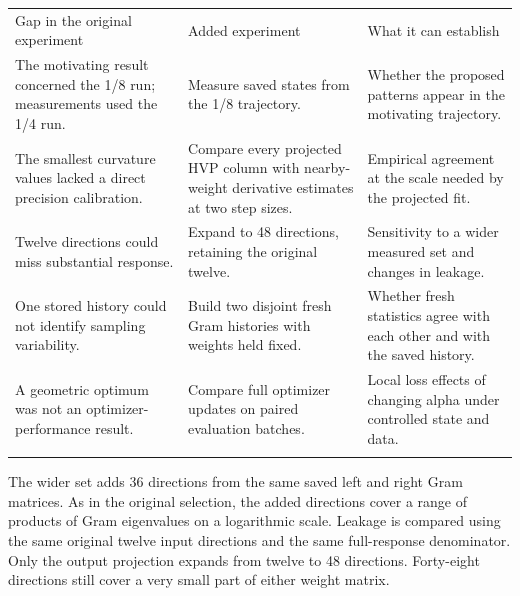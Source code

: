 \documentclass[
  14pt,
  letterpaper,
]{extarticle}
\newcounter{none} %
\begin{document}
{\def\LTcaptype{none} %
\begin{longtable}[]{@{}
  >{\raggedright\arraybackslash}p{}
  >{\raggedright\arraybackslash}p{}
  >{\raggedright\arraybackslash}p{}@{}}
\toprule\noalign{}
\begin{minipage}[b]{\linewidth}\raggedright
Gap in the original experiment
\end{minipage} & \begin{minipage}[b]{\linewidth}\raggedright
Added experiment
\end{minipage} & \begin{minipage}[b]{\linewidth}\raggedright
What it can establish
\end{minipage} \\*
\midrule\noalign{}
\endhead
\bottomrule\noalign{}
\endlastfoot
The motivating result concerned the 1/8 run; measurements used the 1/4
run. & Measure saved states from the 1/8 trajectory. & Whether the
proposed patterns appear in the motivating trajectory. \\*
The smallest curvature values lacked a direct precision calibration. &
Compare every projected HVP column with nearby-weight derivative
estimates at two step sizes. & Empirical agreement at the scale needed
by the projected fit. \\*
Twelve directions could miss substantial response. & Expand to 48
directions, retaining the original twelve. & Sensitivity to a wider
measured set and changes in leakage. \\*
One stored history could not identify sampling variability. & Build two
disjoint fresh Gram histories with weights held fixed. & Whether fresh
statistics agree with each other and with the saved history. \\*
A geometric optimum was not an optimizer-performance result. & Compare
full optimizer updates on paired evaluation batches. & Local loss
effects of changing alpha under controlled state and data. \\*
\end{longtable}
}

The wider set adds 36 directions from the same saved left and right Gram
matrices. As in the original selection, the added directions cover a
range of products of Gram eigenvalues on a logarithmic scale. Leakage is
compared using the same original twelve input directions and the same
full-response denominator. Only the output projection expands from
twelve to 48 directions. Forty-eight directions still cover a very small
part of either weight matrix.
\end{document}
